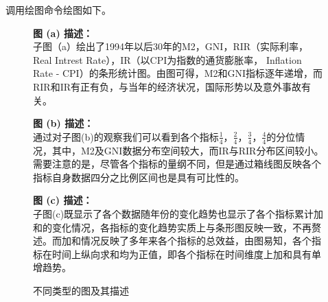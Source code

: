 调用绘图命令绘图如下。

\begin{figure}[H]
	\centering
	\begin{minipage}[t]{0.48\linewidth}
		
		\vspace{0.5em}
		
		
		\vspace{0.5em}
		
	\end{minipage}%
	\hfill
	\begin{minipage}[t]{0.48\linewidth}
		\vspace{1em}
		\textbf{图 (a) 描述：}\\
		子图（a）绘出了1994年以后30年的M2，GNI，RIR（实际利率，Real Intrest Rate），IR（以CPI为指数的通货膨胀率， Inflation Rate - CPI）的条形统计图。由图可得，M2和GNI指标逐年递增，而RIR和IR有正有负，与当年的经济状况，国际形势以及意外事故有关。
		
		\vspace{4em}
		
		\textbf{图 (b) 描述：}\\
		通过对子图(b)的观察我们可以看到各个指标$\frac{1}{4}$，$\frac{2}{4}$，$\frac{3}{4}$，$\frac{4}{4}$的分位情况，其中，M2及GNI数据分布空间较大，而IR与RIR分布区间较小。需要注意的是，尽管各个指标的量纲不同，但是通过箱线图反映各个指标自身数据四分之比例区间也是具有可比性的。
		
		\vspace{4em}
		
		\textbf{图 (c) 描述：}\\
		子图(c)既显示了各个数据随年份的变化趋势也显示了各个指标累计加和的变化情况，各指标的变化趋势实质上与条形图反映一致，不再赘述。而加和情况反映了多年来各个指标的总效益，由图易知，各个指标在时间上纵向求和均为正值，即各个指标在时间维度上加和具有单增趋势。
	\end{minipage}
	
	\caption{不同类型的图及其描述}
	\label{fig:all_plots}
\end{figure}


